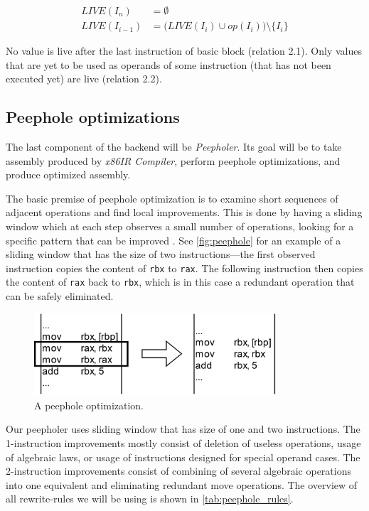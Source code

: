 \documentclass[thesis=M,english]{FITthesis}[2019/12/23]
\begin{document}
\begin{align}
    LIVE(I_n) &= \emptyset\\
    LIVE(I_{i-1}) &= \Big(LIVE(I_i) \cup op(I_i)\Big) \setminus \{I_i\}
\end{align}

No value is live after the last instruction of basic block (relation 2.1). Only values that are yet to be used as operands of some instruction (that has not been executed yet) are live (relation 2.2).

\subsection{Peephole optimizations}
The last component of the backend will be \emph{Peepholer}. Its goal will be to take assembly produced by \emph{x86IR Compiler}, perform peephole optimizations, and produce optimized assembly.

The basic premise of peephole optimization is to examine short sequences of adjacent operations and find local improvements. This is done by having a sliding window which at each step observes a small number of operations, looking for a specific pattern that can be improved \cite[Chap. 11.5.1]{eng_comp}. See \autoref{fig:peephole} for an example of a sliding window that has the size of two instructions---the first observed instruction copies the content of \texttt{rbx} to \texttt{rax}. The following instruction then copies the content of \texttt{rax} back to \texttt{rbx}, which is in this case a redundant operation that can be safely eliminated.

\begin{figure}
    \centering
    \includegraphics[width=9cm]{img/peephole.png}
    \caption{A peephole optimization.}\label{fig:peephole}
\end{figure}

Our peepholer uses sliding window that has size of one and two instructions. The 1-instruction improvements mostly consist of deletion of useless operations, usage of algebraic laws, or usage of instructions designed for special operand cases. The 2-instruction improvements consist of combining of several algebraic operations into one equivalent and eliminating redundant move operations. The overview of all rewrite-rules we will be using is shown in \autoref{tab:peephole_rules}.
\end{document}
